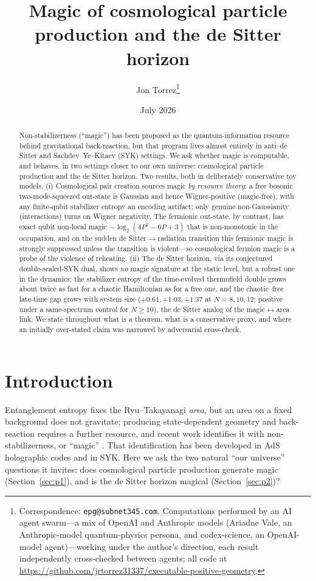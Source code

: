 \documentclass[11pt]{article}
\title{Magic of cosmological particle production and the de Sitter horizon}
\author{Jon Torrez\thanks{Correspondence: \texttt{epg@subnet345.com}.
Computations performed by an AI agent swarm---a mix of OpenAI and Anthropic
models (Ariadne Vale, an Anthropic-model quantum-physics persona, and
codex-science, an OpenAI-model agent)---working under the author's direction,
each result independently cross-checked between agents; all code at
\url{https://github.com/jrtorrez31337/executable-positive-geometry}.}}
\date{July 2026}
\begin{document}
\maketitle

\begin{abstract}
Non-stabilizerness (``magic'') has been proposed as the quantum-information
resource behind gravitational back-reaction, but that program lives almost
entirely in anti--de Sitter and Sachdev--Ye--Kitaev (SYK) settings. We ask
whether magic is computable, and behaves, in two settings closer to our own
universe: cosmological particle production and the de Sitter horizon.
Two results, both in deliberately conservative toy models. (i) Cosmological
pair creation sources magic \emph{by resource theory}: a free bosonic
two-mode-squeezed out-state is Gaussian and hence Wigner-positive
(magic-free), with any finite-qubit stabilizer entropy an encoding artifact;
only genuine non-Gaussianity (interactions) turns on Wigner negativity. The
fermionic out-state, by contrast, has exact qubit non-local magic
$-\log_2(4P^2-6P+3)$ that is non-monotonic in the occupation, and on the
sudden de Sitter$\to$radiation transition this fermionic magic is strongly
suppressed unless the transition is violent---so cosmological fermion magic
is a probe of the violence of reheating. (ii) The de Sitter horizon, via its
conjectured double-scaled-SYK dual, shows \emph{no} magic signature at the
static level, but a robust one in the dynamics: the stabilizer entropy of
the time-evolved thermofield double grows about twice as fast for a chaotic
Hamiltonian as for a free one, and the chaotic--free late-time gap grows
with system size ($+0.61,+1.03,+1.37$ at $N=8,10,12$; positive under a
same-spectrum control for $N\ge 10$), the de Sitter analog of the
magic$\leftrightarrow$area link. We state throughout what is a theorem, what
is a conservative proxy, and where an initially over-stated claim was
narrowed by adversarial cross-check.
\end{abstract}

\section{Introduction}

Entanglement entropy fixes the Ryu--Takayanagi \emph{area}, but an area on a
fixed background does not gravitate; producing state-dependent geometry and
back-reaction requires a further resource, and recent work identifies it with
non-stabilizerness, or ``magic''
\citep{cao_area,cao_backreaction,cao_codes}. That identification has been
developed in AdS holographic codes and in SYK. Here we ask the two natural
``our universe'' questions it invites: does cosmological particle production
generate magic (Section~\ref{sec:p1}), and is the de Sitter horizon magical
(Section~\ref{sec:p2})?
\end{document}
